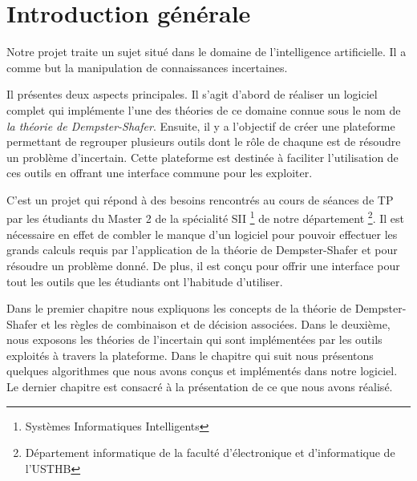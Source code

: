{}
\chapter*{Introduction générale}

Notre projet traite un sujet situé dans le domaine de l'intelligence artificielle. Il a comme but la
manipulation de connaissances incertaines.

Il présentes deux aspects principales. Il s'agit d'abord de réaliser un logiciel complet qui implémente l'une des
théories de ce domaine connue sous le nom de \emph{la théorie de Dempster-Shafer}. Ensuite, il y a l'objectif de
créer une plateforme permettant de regrouper plusieurs outils dont le rôle de chaqune est de résoudre un problème
d'incertain. Cette plateforme est destinée à faciliter l'utilisation de ces outils en offrant une interface
commune pour les exploiter.

C'est un projet qui répond à des besoins rencontrés au cours de séances de TP par les étudiants du Master 2 de la
spécialité SII \footnote{Systèmes Informatiques Intelligents} de notre département \footnote{Département informatique
de la faculté d'électronique et d'informatique de l'USTHB}. Il est nécessaire en effet de combler le manque d'un logiciel
pour pouvoir effectuer les grands calculs requis par l'application de la théorie de Dempster-Shafer et pour résoudre un
problème donné. De plus, il est conçu pour offrir une interface pour tout les outils que les étudiants ont l'habitude
d'utiliser.

Dans le premier chapitre nous expliquons les concepts de la théorie de Dempster-Shafer et les règles de combinaison
et de décision associées. Dans le deuxième, nous exposons les théories de l'incertain qui sont implémentées
par les outils exploités à travers la plateforme. Dans le chapitre qui suit nous présentons quelques algorithmes que
nous avons conçus et implémentés dans notre logiciel. Le dernier chapitre est consacré à la présentation de ce que
nous avons réalisé.